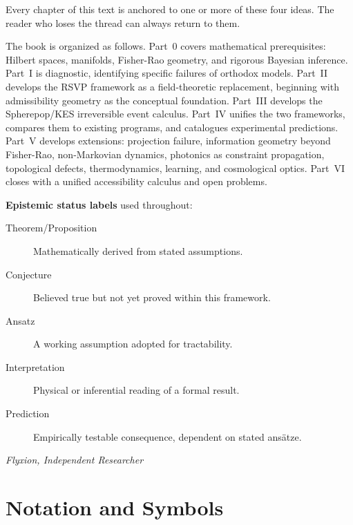 \documentclass[11pt, openright, twoside]{book}
\theoremstyle{plain}
\theoremstyle{definition}
\theoremstyle{remark}
\begin{document}
Every chapter of this text is anchored to one or more of these four ideas. The reader who
loses the thread can always return to them.

\medskip
The book is organized as follows. Part~0 covers mathematical prerequisites: Hilbert spaces,
manifolds, Fisher-Rao geometry, and rigorous Bayesian inference. Part~I is diagnostic,
identifying specific failures of orthodox models. Part~II develops the RSVP framework as
a field-theoretic replacement, beginning with admissibility geometry as the conceptual
foundation. Part~III develops the Spherepop/KES irreversible event calculus. Part~IV
unifies the two frameworks, compares them to existing programs, and catalogues experimental
predictions. Part~V develops extensions: projection failure, information geometry beyond
Fisher-Rao, non-Markovian dynamics, photonics as constraint propagation, topological
defects, thermodynamics, learning, and cosmological optics. Part~VI closes with a unified
accessibility calculus and open problems.

\medskip
\textbf{Epistemic status labels} used throughout:
\begin{description}
  \item[Theorem/Proposition] Mathematically derived from stated assumptions.
  \item[Conjecture] Believed true but not yet proved within this framework.
  \item[Ansatz] A working assumption adopted for tractability.
  \item[Interpretation] Physical or inferential reading of a formal result.
  \item[Prediction] Empirically testable consequence, dependent on stated ansätze.
\end{description}

\bigskip
\noindent\textit{Flyxion, Independent Researcher}

\chapter*{Notation and Symbols}
\end{document}
